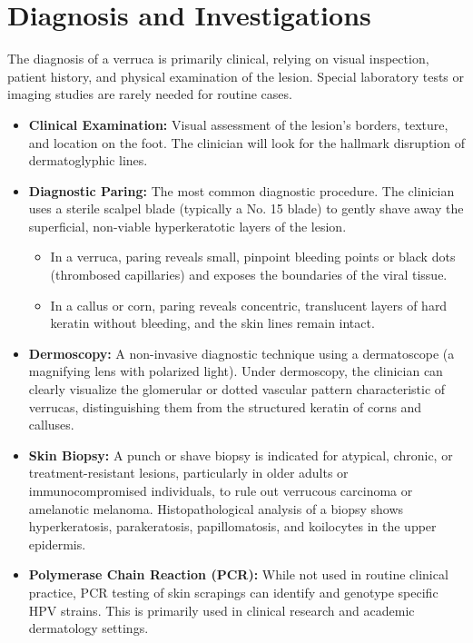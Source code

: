 \section*{Diagnosis and Investigations}
The diagnosis of a verruca is primarily clinical, relying on visual inspection, patient history, and physical examination of the lesion. Special laboratory tests or imaging studies are rarely needed for routine cases.
\begin{itemize}
    \item \textbf{Clinical Examination:} Visual assessment of the lesion's borders, texture, and location on the foot. The clinician will look for the hallmark disruption of dermatoglyphic lines.
    \item \textbf{Diagnostic Paring:} The most common diagnostic procedure. The clinician uses a sterile scalpel blade (typically a No. 15 blade) to gently shave away the superficial, non-viable hyperkeratotic layers of the lesion.
    \begin{itemize}
        \item In a verruca, paring reveals small, pinpoint bleeding points or black dots (thrombosed capillaries) and exposes the boundaries of the viral tissue.
        \item In a callus or corn, paring reveals concentric, translucent layers of hard keratin without bleeding, and the skin lines remain intact.
    \end{itemize}
    \item \textbf{Dermoscopy:} A non-invasive diagnostic technique using a dermatoscope (a magnifying lens with polarized light). Under dermoscopy, the clinician can clearly visualize the glomerular or dotted vascular pattern characteristic of verrucas, distinguishing them from the structured keratin of corns and calluses.
    \item \textbf{Skin Biopsy:} A punch or shave biopsy is indicated for atypical, chronic, or treatment-resistant lesions, particularly in older adults or immunocompromised individuals, to rule out verrucous carcinoma or amelanotic melanoma. Histopathological analysis of a biopsy shows hyperkeratosis, parakeratosis, papillomatosis, and koilocytes in the upper epidermis.
    \item \textbf{Polymerase Chain Reaction (PCR):} While not used in routine clinical practice, PCR testing of skin scrapings can identify and genotype specific HPV strains. This is primarily used in clinical research and academic dermatology settings.
\end{itemize}

